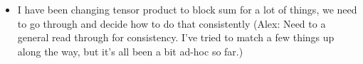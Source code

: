 \documentclass{amsart}
\begin{document}
\begin{itemize}
\item I have been changing tensor product to block sum for a lot of things, we need to go through and decide how to do that consistently (Alex: Need to a general read through for consistency. I've tried to match a few things up along the way, but it's all been a bit ad-hoc so far.)
\end{itemize}
\end{document}
